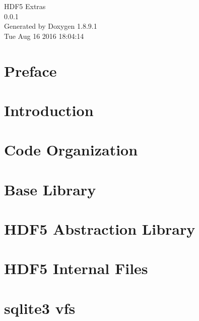 \documentclass[twoside]{book}
\newcommand{\+}{\discretionary{\mbox{\scriptsize$\hookleftarrow$}}{}{}}
\newcommand{\clearemptydoublepage}{%
  \newpage{\pagestyle{empty}\cleardoublepage}%
}
\begin{document}
\hypersetup{pageanchor=false,
             bookmarks=true,
             bookmarksnumbered=true,
             pdfencoding=unicode
            }
\begin{titlepage}
\vspace*{7cm}
\begin{center}%
{\Large H\+D\+F5 Extras \\[1ex]\large 0.\+0.\+1 }\\
\vspace*{1cm}
{\large Generated by Doxygen 1.8.9.1}\\
\vspace*{0.5cm}
{\small Tue Aug 16 2016 18:04:14}\\
\end{center}
\end{titlepage}
\clearemptydoublepage
\tableofcontents
\clearemptydoublepage
{}
\hypersetup{pageanchor=true}

\chapter{Preface}
\label{index}\hypertarget{index}{}
\chapter{Introduction}
\label{intro}
\hypertarget{intro}{}

\chapter{Code Organization}
\label{code_organization}
\hypertarget{code_organization}{}

\chapter{Base Library}
\label{base_library}
\hypertarget{base_library}{}

\chapter{H\+D\+F5 Abstraction Library}
\label{hdf_library}
\hypertarget{hdf_library}{}

\chapter{H\+D\+F5 Internal Files}
\label{ifile_library}
\hypertarget{ifile_library}{}

\chapter{sqlite3 vfs}
\label{vfs_library}
\hypertarget{vfs_library}{}

\end{document}
